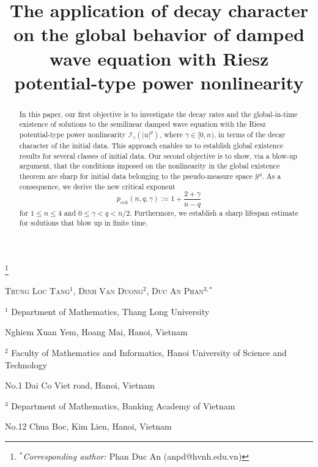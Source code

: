 \documentclass[11pt,reqno]{amsart}
\begin{document}
\title[Semilinear damped wave equation with Riesz potential-type power nonlinearity]{The application of decay character on the global behavior of damped wave equation with Riesz potential-type power nonlinearity}

\thanks{$^* $\textit{Corresponding author:} Phan Duc An (anpd@hvnh.edu.vn)}

\maketitle
\centerline{\scshape Trung Loc Tang$^{1}$, Dinh Van Duong$^{2}$, Duc An Phan$^{3,*}$}
\medskip
{\footnotesize
\centerline{$^1$ Department of Mathematics, Thang Long University}
	\centerline{Nghiem Xuan Yem, Hoang Mai, Hanoi, Vietnam}

	\centerline{$^2$ Faculty of Mathematics and Informatics, Hanoi University of Science and Technology}
	\centerline{No.1 Dai Co Viet road, Hanoi, Vietnam}

    \centerline{$^3$ Department of Mathematics, Banking Academy of Vietnam}
	\centerline{No.12 Chua Boc, Kim Lien, Hanoi, Vietnam}
    }

\begin{abstract}
    In this paper, our first objective is to investigate the decay rates and the global-in-time existence of solutions to the semilinear damped wave equation with the Riesz potential-type power nonlinearity $\mathcal{I}_\gamma\left(|u|^p\right)$, where $\gamma\in[0,n)$, in terms of the decay character of the initial data. This approach enables us to establish global existence results for several classes of initial data. Our second objective is to show, via a blow-up argument, that the conditions imposed on the nonlinearity in the global existence theorem are sharp for initial data belonging to the pseudo-measure space $\mathcal{Y}^q$. As a consequence, we derive the new critical exponent
$$
p_{\mathrm{crit}}(n,q,\gamma):=1+\frac{2+\gamma}{n-q}
$$
for $1\leq n\leq 4$ and $0\leq \gamma<q<n/2$. Furthermore, we establish a sharp lifespan estimate for solutions that blow up in finite time.
\end{abstract}

\end{document}

